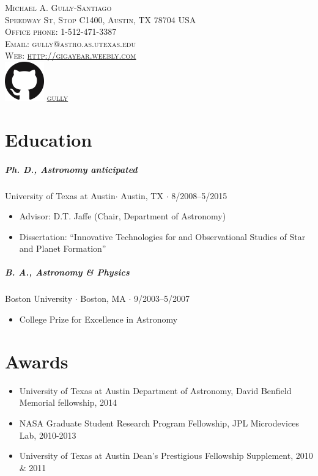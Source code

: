 \documentclass[10pt,letterpaper]{article}
\newcommand{\namestyle}{\Huge \scshape}
\newcommand{\addressstyle}{\color{addresscolor}  \footnotesize \sffamily \upshape}
\begin{document}
\begin{flushright}
    \namestyle Michael A. Gully-Santiago \\[0.3em]
    \addressstyle 
    2515 Speedway St, Stop C1400, Austin, TX 78704 USA \\
    Office phone: 1-512-471-3387\\
    Email: gully@astro.as.utexas.edu \\
    Web: \url{http://gigayear.weebly.com} \\
    \includegraphics[scale=0.17]{ghmark/GitHub-Mark/PNG/GitHub-Mark-64px.png} \href{http://github.com/gully}{gully}
\end{flushright}

\small

\section*{Education}

\subparagraph{Ph. D., Astronomy \emph{anticipated}}
University of Texas at Austin$\cdot$ Austin, TX $\cdot$ 8/2008--5/2015
\begin{itemize}
    \item Advisor: D.T. Jaffe (Chair, Department of Astronomy)
    \item Dissertation: ``Innovative Technologies for and Observational Studies of Star and Planet Formation''
\end{itemize}

\subparagraph{B. A., Astronomy \& Physics}
Boston University $\cdot$ Boston, MA $\cdot$ 9/2003--5/2007
\begin{itemize}
    \item College Prize for Excellence in Astronomy
\end{itemize}


\section*{Awards}

\begin{itemize}
    \item University of Texas at Austin Department of Astronomy, David Benfield Memorial fellowship, 2014
    \item NASA Graduate Student Research Program Fellowship, JPL Microdevices Lab, 2010-2013
    \item University of Texas at Austin Dean's Prestigious Fellowship Supplement, 2010 \& 2011
\end{itemize}
\end{document}
